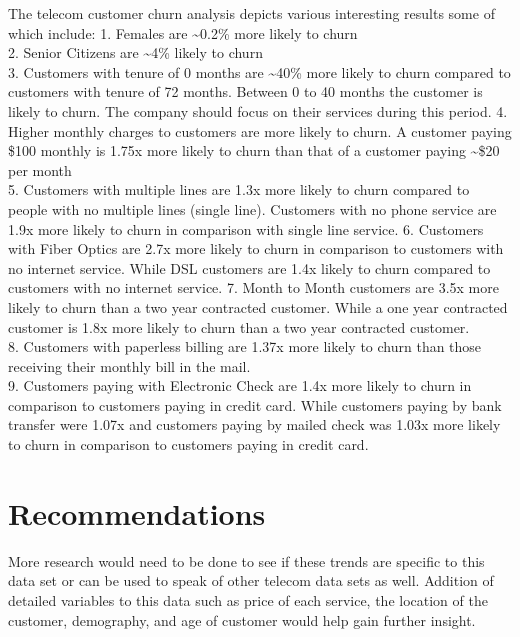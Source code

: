 \documentclass[]{article}
\begin{document}
The telecom customer churn analysis depicts various interesting results
some of which include: 1. Females are \textasciitilde{}0.2\% more likely
to churn\\
2. Senior Citizens are \textasciitilde{}4\% likely to churn\\
3. Customers with tenure of 0 months are \textasciitilde{}40\% more
likely to churn compared to customers with tenure of 72 months. Between
0 to 40 months the customer is likely to churn. The company should focus
on their services during this period. 4. Higher monthly charges to
customers are more likely to churn. A customer paying \$100 monthly is
1.75x more likely to churn than that of a customer paying
\textasciitilde{}\$20 per month\\
5. Customers with multiple lines are 1.3x more likely to churn compared
to people with no multiple lines (single line). Customers with no phone
service are 1.9x more likely to churn in comparison with single line
service. 6. Customers with Fiber Optics are 2.7x more likely to churn in
comparison to customers with no internet service. While DSL customers
are 1.4x likely to churn compared to customers with no internet service.
7. Month to Month customers are 3.5x more likely to churn than a two
year contracted customer. While a one year contracted customer is 1.8x
more likely to churn than a two year contracted customer.\\
8. Customers with paperless billing are 1.37x more likely to churn than
those receiving their monthly bill in the mail.\\
9. Customers paying with Electronic Check are 1.4x more likely to churn
in comparison to customers paying in credit card. While customers paying
by bank transfer were 1.07x and customers paying by mailed check was
1.03x more likely to churn in comparison to customers paying in credit
card.

\section{Recommendations}\label{recommendations}

More research would need to be done to see if these trends are specific
to this data set or can be used to speak of other telecom data sets as
well. Addition of detailed variables to this data such as price of each
service, the location of the customer, demography, and age of customer
would help gain further insight.
\end{document}
